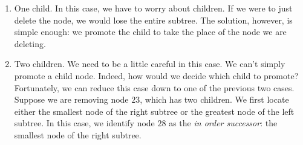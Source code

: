 \begin{enumerate}
\item One child.
In this case, we have to worry about children.
If we were to just delete the node, we would lose the entire subtree.
The solution, however, is simple enough: we promote the child to take the place of the node we are deleting.
\begin{center}
\begin{minipage}{0.3\textwidth}
\end{minipage}
\begin{minipage}{0.2\textwidth}
   \begin{center}
   \end{center}
\end{minipage}
\begin{minipage}{0.3\textwidth}
\end{minipage}
\end{center}
\item Two children.
We need to be a little careful in this case.
We can't simply promote a child node.
Indeed, how would we decide which child to promote?
Fortunately, we can reduce this case down to one of the previous two cases.
Suppose we are removing node $23$, which has two children.
We first locate either the smallest node of the right subtree or the greatest node of the left subtree.
In this case, we identify node $28$ as the \emph{in order successor}: the smallest node of the right subtree.

\end{enumerate}
